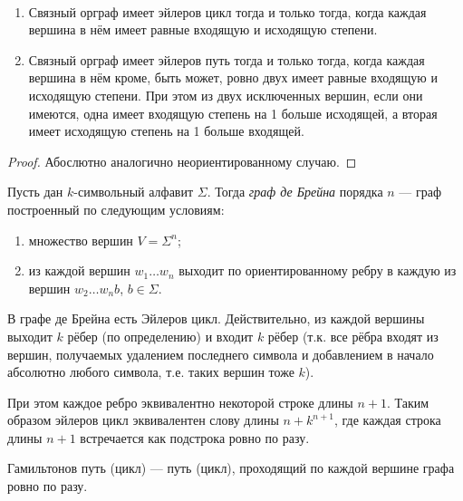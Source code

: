\documentclass[12pt,a4paper]{article}
\begin{document}
    \begin{theorem}\ 
        \begin{enumerate}
            \item Связный орграф имеет эйлеров цикл тогда и только тогда, когда каждая вершина в нём имеет равные входящую и исходящую степени.
            \item Связный орграф имеет эйлеров путь тогда и только тогда, когда каждая вершина в нём кроме, быть может, ровно двух имеет равные входящую и исходящую степени. При этом из двух исключенных вершин, если они имеются, одна имеет входящую степень на 1 больше исходящей, а вторая имеет исходящую степень на 1 больше входящей.
        \end{enumerate}
    \end{theorem}

    \begin{proof}
        Абослютно аналогично неориентированному случаю.
    \end{proof}

    \begin{definition}
        Пусть дан $k$-символьный алфавит $\Sigma$. Тогда \emph{граф де Брейна} порядка $n$ --- граф построенный по следующим условиям:
        \begin{enumerate}
            \item множество вершин $V = \Sigma^n$;
            \item из каждой вершин $w_1\dots w_n$ выходит по ориентированному ребру в каждую из вершин $w_2\dots w_n b$, $b \in \Sigma$.
        \end{enumerate}
    \end{definition}

    \begin{remark}
        В графе де Брейна есть Эйлеров цикл. Действительно, из каждой вершины выходит $k$ рёбер (по определению) и входит $k$ рёбер (т.к. все рёбра входят из вершин, получаемых удалением последнего символа и добавлением в начало абсолютно любого символа, т.е. таких вершин тоже $k$).

        При этом каждое ребро эквивалентно некоторой строке длины $n+1$. Таким образом эйлеров цикл эквивалентен слову длины $n + k^{n+1}$, где каждая строка длины $n+1$ встречается как подстрока ровно по разу.
    \end{remark}

    \begin{definition}
        Гамильтонов путь (цикл) --- путь (цикл), проходящий по каждой вершине графа ровно по разу.
    \end{definition}
\end{document}
